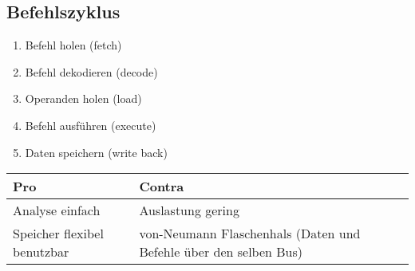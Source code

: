 \subsection{Befehlszyklus}
\begin{enumerate}
    \item Befehl holen (fetch)
    \item Befehl dekodieren (decode)
    \item Operanden holen (load)
    \item Befehl ausführen (execute)
    \item Daten speichern (write back)
\end{enumerate}

\begin{table}[H]
    \centering
    \begin{tabular}{p{}p{}}
        \toprule
        Pro & Contra \\
        \midrule
        Analyse einfach & Auslastung gering \\
        Speicher flexibel benutzbar & von-Neumann Flaschenhals (Daten und Befehle über den selben Bus)\\
        \bottomrule
    \end{tabular}
\end{table}

